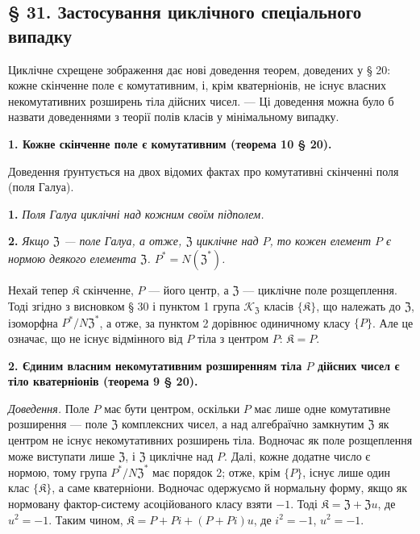 \documentclass[11pt]{article}
\begin{document}
\subsection*{§ 31. Застосування циклічного спеціального випадку}\label{anwendungen-des-zyklischen-spezialfalles}

Циклічне схрещене зображення дає нові доведення теорем, доведених у § 20: кожне скінченне поле є комутативним, і, крім кватерніонів, не існує власних некомутативних розширень тіла дійсних чисел. --- Ці доведення можна було б назвати доведеннями з теорії полів класів у мінімальному випадку.

\noindent\textbf{1. Кожне скінченне поле є комутативним (теорема 10 § 20).}

Доведення ґрунтується на двох відомих фактах про комутативні скінченні поля (поля Галуа).

\noindent\textbf{1.} \emph{Поля Галуа циклічні над кожним своїм підполем.}

\noindent\textbf{2.} \emph{Якщо \(\mathfrak Z\) --- поле Галуа, а отже, \(\mathfrak Z\) циклічне над \(P\), то кожен елемент \(P\) є нормою деякого елемента \(\mathfrak Z\). \(P^*=N(\mathfrak Z^*)\).}

Нехай тепер \(\mathfrak K\) скінченне, \(P\) --- його центр, а \(\mathfrak Z\) --- циклічне поле розщеплення. Тоді згідно з висновком § 30 і пунктом 1 група \(\mathscr K_{\mathfrak Z}\) класів \(\{\mathfrak K\}\), що належать до \(\mathfrak Z\), ізоморфна \(P^*/N\mathfrak Z^*\), а отже, за пунктом 2 дорівнює одиничному класу \(\{P\}\). Але це означає, що не існує відмінного від \(P\) тіла з центром \(P\): \(\mathfrak K=P\).

\noindent\textbf{2. Єдиним власним некомутативним розширенням тіла \(P\) дійсних чисел є тіло кватерніонів (теорема 9 § 20).}

\noindent\emph{Доведення.} Поле \(P\) має бути центром, оскільки \(P\) має лише одне комутативне розширення --- поле \(\mathfrak Z\) комплексних чисел, а над алгебраїчно замкнутим \(\mathfrak Z\) як центром не існує некомутативних розширень тіла. Водночас як поле розщеплення може виступати лише \(\mathfrak Z\), і \(\mathfrak Z\) циклічне над \(P\). Далі, кожне додатне число є нормою, тому група \(P^*/N\mathfrak Z^*\) має порядок 2; отже, крім \(\{P\}\), існує лише один клас \(\{\mathfrak K\}\), а саме кватерніони. Водночас одержуємо й нормальну форму, якщо як нормовану фактор-систему асоційованого класу взяти \(-1\). Тоді \(\mathfrak K=\mathfrak Z+\mathfrak Zu\), де \(u^2=-1\). Таким чином, \(\mathfrak K=P+Pi+(P+Pi)u\), де \(i^2=-1\), \(u^2=-1\).
\end{document}
